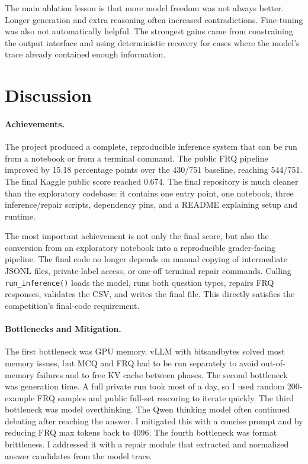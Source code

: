 \documentclass{article}
\begin{document}
The main ablation lesson is that more model freedom was not always better. Longer generation and extra reasoning often increased contradictions. Fine-tuning was also not automatically helpful. The strongest gains came from constraining the output interface and using deterministic recovery for cases where the model's trace already contained enough information.

\section{Discussion}
\label{sec:discussion}

\paragraph{Achievements.}
The project produced a complete, reproducible inference system that can be run from a notebook or from a terminal command. The public FRQ pipeline improved by 15.18 percentage points over the 430/751 baseline, reaching 544/751. The final Kaggle public score reached 0.674. The final repository is much cleaner than the exploratory codebase: it contains one entry point, one notebook, three inference/repair scripts, dependency pins, and a README explaining setup and runtime.

The most important achievement is not only the final score, but also the conversion from an exploratory notebook into a reproducible grader-facing pipeline. The final code no longer depends on manual copying of intermediate JSONL files, private-label access, or one-off terminal repair commands. Calling \texttt{run\_inference()} loads the model, runs both question types, repairs FRQ responses, validates the CSV, and writes the final file. This directly satisfies the competition's final-code requirement.

\paragraph{Bottlenecks and Mitigation.}
The first bottleneck was GPU memory. vLLM with bitsandbytes solved most memory issues, but MCQ and FRQ had to be run separately to avoid out-of-memory failures and to free KV cache between phases. The second bottleneck was generation time. A full private run took most of a day, so I used random 200-example FRQ samples and public full-set rescoring to iterate quickly. The third bottleneck was model overthinking. The Qwen thinking model often continued debating after reaching the answer. I mitigated this with a concise prompt and by reducing FRQ max tokens back to 4096. The fourth bottleneck was format brittleness. I addressed it with a repair module that extracted and normalized answer candidates from the model trace.
\end{document}

